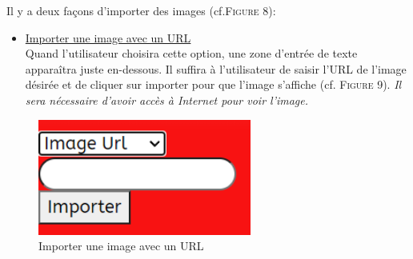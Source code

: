 \documentclass{article}
\begin{document}
            \pagebreak
                {\large Il y a deux façons d'importer des images (cf.\textsc{Figure 8}):}
                \begin{itemize}
                \item \underline{\textsf{Importer une image avec un URL}}\\
                    Quand l'utilisateur choisira cette option, une zone d'entrée de texte apparaîtra juste en-dessous. Il suffira à l'utilisateur de saisir l'URL de l'image désirée et de cliquer sur importer pour que l'image s'affiche (cf. \textsc{Figure 9}). \textit{Il sera nécessaire d'avoir accès à Internet pour voir l'image.}\\
                \end{itemize}
                \begin{figure}[h]
                        \centering \includegraphics[width=7cm]{images/importURL.png}
                        \caption{Importer une image avec un URL}
                \end{figure}
                
\end{document}
